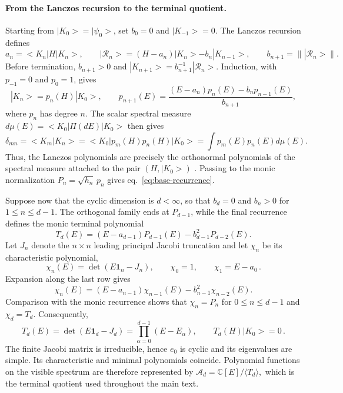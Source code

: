 \documentclass[a4paper,11pt]{article}
\def\ket#1{|#1>}%
\def\bra#1{<#1|}%
\def\braket#1#2{<#1|#2>}%
\def\dd{d}%
\def\Jac{J}%
\theoremstyle{definition}
\theoremstyle{remark}
\newcommand{\ket}[1]{|#1\rangle}
\newcommand{\bra}[1]{\langle #1|}
\newcommand{\braket}[2]{\langle #1\mid #2\rangle}
\newcommand{\dd}{\mathrm d}
\newcommand{\CC}{\mathbb C}
\newcommand{\cA}{\mathcal A}
\newcommand{\Jac}{\mathsf J}
\newcommand{\Id}{\mathbf 1}
\begin{document}
\paragraph{From the Lanczos recursion to the terminal quotient.} 
Starting from $\ket{K_0}=\ket{\psi_0}$, set $b_0=0$ and $\ket{K_{-1}}=0$. The Lanczos recursion \cite{Lanczos1950} defines
\begin{equation}
   a_n=\bra{K_n}H\ket{K_n},
   \qquad
   \ket{\mathcal R_n}=(H-a_n)\ket{K_n}-b_n\ket{K_{n-1}},
   \qquad
   b_{n+1}=\|\ket{\mathcal R_n}\|.
\end{equation}
Before termination, $b_{n+1}>0$ and $\ket{K_{n+1}}=b_{n+1}^{-1}\ket{\mathcal R_n}$. Induction, with $p_{-1}=0$ and $p_0=1$, gives
\begin{equation}
   \ket{K_n}=p_n(H)\ket{K_0},
   \qquad
   p_{n+1}(E)=
   \frac{(E-a_n)p_n(E)-b_np_{n-1}(E)}{b_{n+1}},
\end{equation}
where $p_n$ has degree $n$. The scalar spectral measure $\dd\mu(E)=\bra{K_0}\Pi(\dd E)\ket{K_0}$ then gives
\begin{equation}
   \delta_{mn}
   =\braket{K_m}{K_n}
   =\bra{K_0}p_m(H)p_n(H)\ket{K_0}
   =\int p_m(E)p_n(E)\dd\mu(E).
\end{equation}
Thus, the Lanczos polynomials are precisely the orthonormal polynomials of the spectral measure attached to the pair $(H,\ket{K_0})$ \cite{Chihara1978,SimonOPRL1}. Passing to the monic normalization $P_n=\sqrt{h_n}\,p_n$ gives eq.~\eqref{eq:base-recurrence}.

Suppose now that the cyclic dimension is $d<\infty$, so that $b_d=0$ and $b_n>0$ for $1\le n\le d-1$. The orthogonal family ends at $P_{d-1}$, while the final recurrence defines the monic terminal polynomial
\begin{equation}
   T_d(E)=(E-a_{d-1})P_{d-1}(E)-b_{d-1}^2P_{d-2}(E).
\end{equation}
Let $\Jac_n$ denote the $n\times n$ leading principal Jacobi truncation and let $\chi_n$ be its
characteristic polynomial,
\begin{equation}
      \chi_n(E)=\det(E\Id_n-\Jac_n),
   \qquad
   \chi_0=1,
   \qquad
   \chi_1=E-a_0\,.
\end{equation}
Expansion along the last row gives
\begin{equation}
      \chi_n(E)=(E-a_{n-1})\chi_{n-1}(E)
   -b_{n-1}^2\chi_{n-2}(E).
\end{equation}
Comparison with the monic recurrence shows that $\chi_n=P_n$ for $0\le n\le d-1$ and $\chi_d=T_d$. Consequently,
\begin{equation}
   T_d(E)=\det(E\Id_d-\Jac_d)
   =\prod_{\alpha=0}^{d-1}(E-E_\alpha),
   \qquad
   T_d(H)\ket{K_0}=0\,.
   \label{eq:terminal-characteristic-app}
\end{equation}
The finite Jacobi matrix is irreducible, hence $e_0$ is cyclic and its eigenvalues are simple. Its characteristic and minimal polynomials coincide. Polynomial functions on the visible spectrum are therefore represented by
$
   \cA_d=\CC[E]/\langle T_d\rangle,
$
which is the terminal quotient used throughout the main text.
\end{document}
